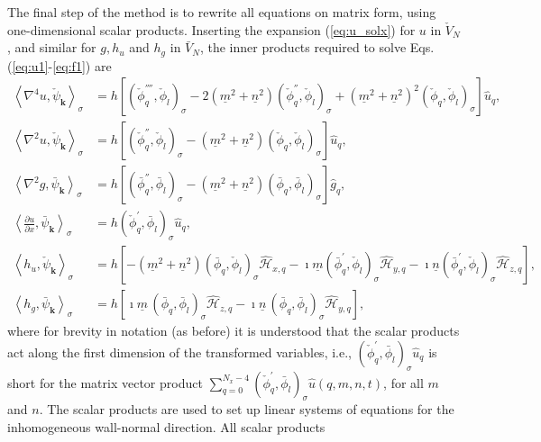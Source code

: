 \documentclass[preprint]{elsarticle}
\newcommand{\N}[1]{\check{#1}}
\newcommand{\D}[1]{\bar{#1}}
\begin{document}
The final step of the method is to rewrite all equations on matrix form, using one-dimensional scalar products. Inserting the expansion (\ref{eq:u_solx}) for $u$ in $\N{V}_N$, and similar for $g, h_u$ and $h_g$ in $\D{V}_N$, the inner products required to solve Eqs. (\ref{eq:u1}-\ref{eq:f1}) are
\begin{align}
\left<\nabla^4u, \N{\psi}_{\bm{k}}\right>_{\sigma} &= h\left[ \left( 
\N{\phi}_q^{''''}, 
\N{\phi}_l\right)_{\sigma} -2(\underline{m}^2+\underline{n}^2) \left( \N{\phi}_q^{''}, 
\N{\phi}_l\right)_{\sigma} + (\underline{m}^2+\underline{n}^2)^2\left( \N{\phi}_q, 
\N{\phi}_l\right)_{\sigma}  \right] \hat{u}_q, \\
\left< \nabla^2 u, \N{\psi}_{\bm{k}}\right>_{\sigma} &= h\left[\left( \N{\phi}_q^{''}, 
\N{\phi}_l\right)_{\sigma} - (\underline{m}^2+\underline{n}^2)\left( \N{\phi}_q, 
\N{\phi}_l \right)_{\sigma} \right] \hat{u}_q, \\
\left< \nabla^2 g, \D{\psi}_{\bm{k}}\right>_{\sigma} &= h\left[\left( \D{\phi}_q^{''}, 
\D{\phi}_l\right)_{\sigma} - (\underline{m}^2+\underline{n}^2)\left( \D{\phi}_q, 
\D{\phi}_l \right)_{\sigma} \right] \hat{g}_q, \\
\left<\frac{\partial u}{\partial x}, \D{\psi}_{\bm{k}}\right>_{\sigma} &=
h\left(\N{\phi}_q^{'}, \D{\phi}_l\right)_{\sigma} \hat{u}_q, \\
\left<h_u, \N{\psi}_{\bm{k}} \right>_{\sigma} &= 
h\left[-(\underline{m}^2+\underline{n}^2) 
\left(\D{\phi}_q, 
\N{\phi}_l \right)_{\sigma} \hat{\mathcal{H}}_{x, q} - \imath \underline{m}\left(\D{\phi}_q^{'}, 
\N{\phi}_l \right)_{\sigma} \hat{\mathcal{H}}_{y, q} - \imath 
\underline{n}\left(\D{\phi}_q^{'}, \N{\phi}_l \right)_{\sigma} 
\hat{\mathcal{H}}_{z, q}\right], \label{eq:S_hv}
\\
\left< h_g, \D{\psi}_{\bm{k}} \right>_{\sigma} &= h\left[ \imath \underline{m}\, \left(\D{\phi}_q, \D{\phi}_l \right)_{\sigma} 
\hat{\mathcal{H}}_{z, q} - \imath \underline{n}\, \left(\D{\phi}_q, \D{\phi}_l \right)_{\sigma} \hat{\mathcal{H}}_{y, q} 
\right],\label{eq:S_hg}
\end{align}
where for brevity in notation (as before) it is understood that the scalar products
act along the first dimension of the transformed variables, i.e.,  $ 
(\N{\phi}_q^{'}, \D{\phi}_l)_{\sigma} \hat{u}_q$ is short for the matrix 
vector product $ \sum_{q=0}^{N_x-4}( \N{\phi}_q^{'}, \D{\phi}_l)_{\sigma} 
\hat{u}(q, {m}, {n}, t)$, for all $m$ and $n$. The scalar products are used to set up linear systems 
of equations for the inhomogeneous wall-normal direction. All scalar products 
\end{document}
